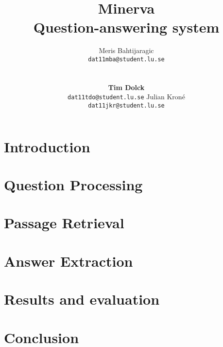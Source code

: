 \documentclass[11pt,letterpaper]{article}
\title{Minerva \\ Question-answering system}
\author{Meris Bahtijaragic\\
	    {\tt dat11mba@student.lu.se}
	    \And
      \\
      \\
      \\
      \textbf{Tim Dolck}\\
      {\tt dat11tdo@student.lu.se}
      \And
      Julian Kron\'{e}\\
      {\tt dat11jkr@student.lu.se}
}
\date{}
\begin{document}
\maketitle
\begin{abstract}

\end{abstract}
\section{Introduction}

\section{Question Processing}

\section{Passage Retrieval}

\section{Answer Extraction}

\section{Results and evaluation}

\section{Conclusion}

\end{document}
